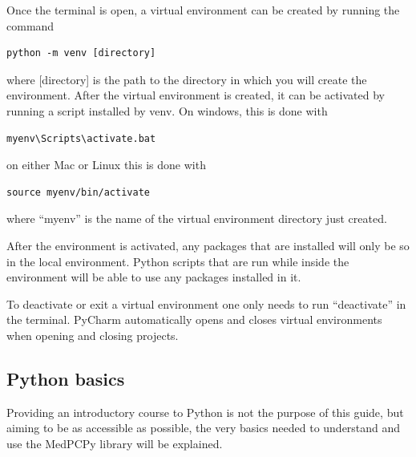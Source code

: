 \documentclass[a4paper,12pt]{article}
\begin{document}
Once the terminal is open, a virtual environment can be created by running the command
\begin{tcolorbox}[
    enhanced,
    attach boxed title to top left={xshift=6mm,yshift=-3mm},
    colback=lightgreen!20,
    colframe=lightgreen,
    colbacktitle=lightgreen,
    sharp corners,
    ]
    \begin{verbatim}
python -m venv [directory]
    \end{verbatim}
\end{tcolorbox}
\noindent where [directory] is the path to the directory in which you will create the environment. After the virtual environment is created, it can be activated by running a script installed by venv. On windows, this is done with
\begin{tcolorbox}[
    enhanced,
    attach boxed title to top left={xshift=6mm,yshift=-3mm},
    colback=lightgreen!20,
    colframe=lightgreen,
    colbacktitle=lightgreen,
    sharp corners,
    ]
    \begin{verbatim}
myenv\Scripts\activate.bat
    \end{verbatim}
\end{tcolorbox}
\noindent on either Mac or Linux this is done with
\begin{tcolorbox}[
    enhanced,
    attach boxed title to top left={xshift=6mm,yshift=-3mm},
    colback=lightgreen!20,
    colframe=lightgreen,
    colbacktitle=lightgreen,
    sharp corners,
    ]
    \begin{verbatim}
source myenv/bin/activate
    \end{verbatim}
\end{tcolorbox}
\noindent where ``myenv'' is the name of the virtual environment directory just created.

After the environment is activated, any packages that are installed will only be so in the local environment. Python scripts that are run while inside the environment will be able to use any packages installed in it.

To deactivate or exit a virtual environment one only needs to run ``deactivate'' in the terminal. PyCharm automatically opens and closes virtual environments when opening and closing projects.

\subsection{Python basics}

Providing an introductory course to Python is not the purpose of this guide, but aiming to be as accessible as possible, the very basics needed to understand and use the MedPCPy library will be explained.
\end{document}
